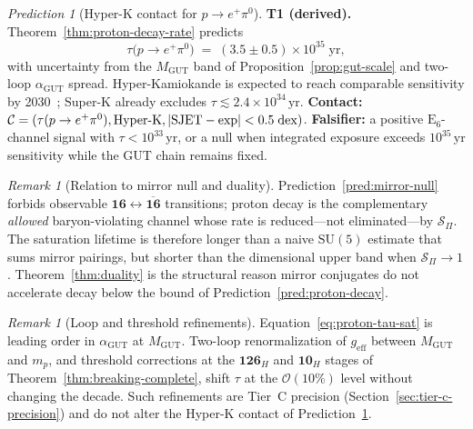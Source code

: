 \documentclass[aps,prd,onecolumn,amsmath,amssymb,nofootinbib,11pt]{revtex4-2}
\numberwithin{equation}{section}
\theoremstyle{plain}
\theoremstyle{definition}
\theoremstyle{remark}
\newtheorem{remark}[theorem]{Remark}
\newtheorem{prediction}[theorem]{Prediction}
\newcommand{\E}[1]{\mathrm{E}_{#1}}
\begin{document}
\begin{prediction}[Hyper-K contact for $p\to e^+\pi^0$]\label{pred:hyperk}
\textbf{T1 (derived).} Theorem~\ref{thm:proton-decay-rate} predicts
\begin{equation}\label{eq:hyperk-target}
  \tau\!\bigl(p\to e^+\pi^0\bigr)
  \;=\;
  (3.5\pm 0.5)\times 10^{35}\;\mathrm{yr},
\end{equation}
with uncertainty from the $M_{\mathrm{GUT}}$ band of
Proposition~\ref{prop:gut-scale} and two-loop $\alpha_{\mathrm{GUT}}$ spread.
Hyper-Kamiokande is expected to reach comparable sensitivity by
2030~\cite{SuperK2020}; Super-K already excludes $\tau\lesssim 2.4\times
10^{34}\,\mathrm{yr}$. \textbf{Contact:}
$\mathcal{C}=(\tau(p\to e^+\pi^0),\mathrm{Hyper\text{-}K},
|{\rm SJET}-{\rm exp}|<0.5\;\mathrm{dex})$.
\textbf{Falsifier:} a positive $\E{6}$-channel signal with
$\tau<10^{33}\,\mathrm{yr}$, or a null when integrated exposure exceeds
$10^{35}\,\mathrm{yr}$ sensitivity while the GUT chain remains fixed.
\end{prediction}

\begin{remark}[Relation to mirror null and duality]
Prediction~\ref{pred:mirror-null} forbids observable
$\mathbf{16}\leftrightarrow\overline{\mathbf{16}}$ transitions; proton decay is
the complementary \emph{allowed} baryon-violating channel whose rate is
reduced—not eliminated—by $\mathcal{S}_\Pi$. The saturation lifetime is
therefore longer than a naive $\mathrm{SU}(5)$ estimate that sums mirror
pairings, but shorter than the dimensional upper band when
$\mathcal{S}_\Pi\to 1$. Theorem~\ref{thm:duality} is the structural reason
mirror conjugates do not accelerate decay below the bound of
Prediction~\ref{pred:proton-decay}.
\end{remark}

\begin{remark}[Loop and threshold refinements]
Equation~\eqref{eq:proton-tau-sat} is leading order in $\alpha_{\mathrm{GUT}}$
at $M_{\mathrm{GUT}}$. Two-loop renormalization of $g_{\mathrm{eff}}$ between
$M_{\mathrm{GUT}}$ and $m_p$, and threshold corrections at the
$\mathbf{126}_H$ and $\mathbf{10}_H$ stages of
Theorem~\ref{thm:breaking-complete}, shift $\tau$ at the $\mathcal{O}(10\%)$
level without changing the decade. Such refinements are Tier~C precision
(Section~\ref{sec:tier-c-precision}) and do not alter the Hyper-K contact of
Prediction~\ref{pred:hyperk}.
\end{remark}%
\end{document}
